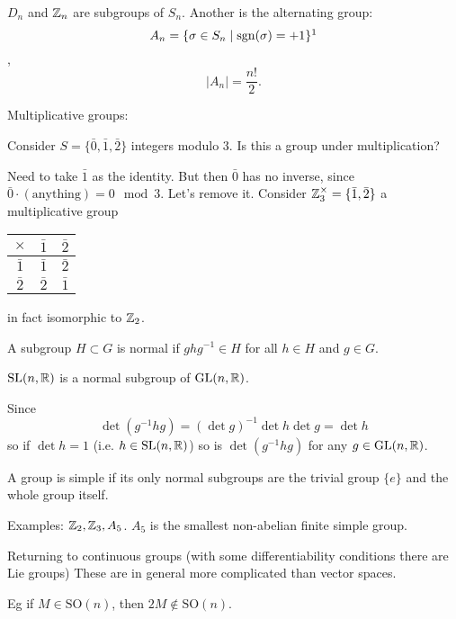 \documentclass[10pt, a4paper]{article}
\begin{document}
$D_n$ and $\mathbb{Z}_n$ are subgroups of $S_n$.
Another is the alternating group:
\[
A_n = \{\sigma \in S_n\mid \mathrm{sgn}(\sigma) = +1\}\footnotemark
\]
,
\[
|A_n| = \frac{n!}{2}.
\]

Multiplicative groups:

Consider $S = \{\bar{0}, \bar{1}, \bar{2}\}$ integers modulo $3$.
Is this a group under multiplication?

Need to take $\bar{1}$ as the identity.
But then $\bar{0}$ has no inverse,
since $\bar{0} \cdot (\text{anything}) = 0\mod{3}$.
Let's remove it.
Consider $\mathbb{Z}_{3}^{\times} = \{\bar{1}, \bar{2}\}$ a multiplicative group
\begin{table}[H]
    \centering
    \begin{tabular}{c|cc}
         $\times$ & $\bar{1}$ & $\bar{2}$ \\
         \hline
         $\bar{1}$ & $\bar{1}$ & $\bar{2}$ \\
         $\bar{2}$ & $\bar{2}$ & $\bar{1}$
    \end{tabular}
\end{table}
in fact isomorphic to $\mathbb{Z}_2$.

\begin{definition}
    A subgroup $H \subset G$ is normal if $ghg ^ {-1} \in H$ for all $h \in H$ and $g \in G$.
\end{definition}

\begin{example}
    $\mathrm{SL}(n, \mathbb{R})$ is a normal subgroup of $\mathrm{GL}(n, \mathbb{R})$.

    Since
    \[
    \det(g ^ {-1}hg) = (\det{g}) ^ {-1}\det{h}\det{g} = \det{h}
    \]
    so if $\det{h} = 1$
    (i.e. $h \in \mathrm{SL}(n, \mathbb{R})$)
    so is $\det(g ^ {-1}hg)$ for any $g \in \mathrm{GL}(n, \mathbb{R})$.
\end{example}

\begin{definition}
    A group is simple if its only normal subgroups are the trivial group $\{e\}$ and the whole group itself.
\end{definition}

Examples:
$\mathbb{Z}_2, \mathbb{Z}_3, A_5$.
$A_5$ is the smallest non-abelian finite simple group.


Returning to continuous groups
(with some differentiability conditions there are Lie groups)
These are in general more complicated than vector spaces.

Eg
if $M \in \mathrm{SO}(n)$,
then $2M \notin \mathrm{SO}(n)$.
\end{document}

